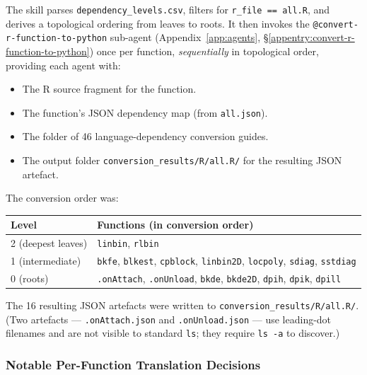 \documentclass[12pt,a4paper]{article}
\begin{document}
The skill parses \texttt{dependency\_levels.csv}, filters for \texttt{r\_file == all.R}, and derives a topological ordering from leaves to roots. It then invokes the \texttt{@convert-r-function-to-python} sub-agent (Appendix~\ref{app:agents}, \S\ref{appentry:convert-r-function-to-python}) once per function, \emph{sequentially} in topological order, providing each agent with:
\begin{itemize}
  \item The R source fragment for the function.
  \item The function's JSON dependency map (from \texttt{all.json}).
  \item The folder of 46 language-dependency conversion guides.
  \item The output folder \texttt{conversion\_results/R/all.R/} for the resulting JSON artefact.
\end{itemize}

The conversion order was:

\begin{center}
\begin{tabular}{ll}
\toprule
Level & Functions (in conversion order) \\
\midrule
2 (deepest leaves) & \texttt{linbin}, \texttt{rlbin} \\
1 (intermediate) &
  \texttt{bkfe}, \texttt{blkest}, \texttt{cpblock},
  \texttt{linbin2D}, \texttt{locpoly}, \texttt{sdiag}, \texttt{sstdiag} \\
0 (roots) &
  \texttt{.onAttach}, \texttt{.onUnload}, \texttt{bkde},
  \texttt{bkde2D}, \texttt{dpih}, \texttt{dpik}, \texttt{dpill} \\
\bottomrule
\end{tabular}
\end{center}

The 16 resulting JSON artefacts were written to \texttt{conversion\_results/R/all.R/}. (Two artefacts --- \texttt{.onAttach.json} and \texttt{.onUnload.json} --- use leading-dot filenames and are not visible to standard \texttt{ls}; they require \texttt{ls -a} to discover.)

\subsubsection{Notable Per-Function Translation Decisions}
\end{document}
